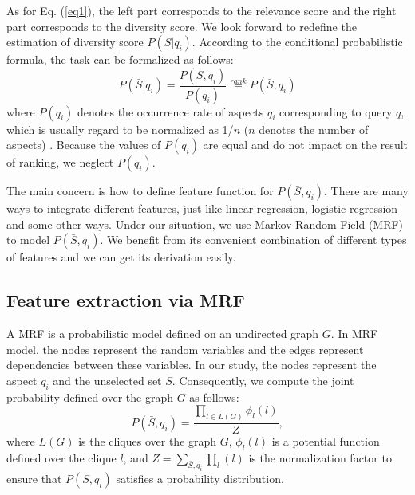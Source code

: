 \documentclass[review]{elsarticle}
\newcommand\revised[1]{{\color{black} #1}}
\begin{document}
\revised{
As for Eq. (\ref{eq1}), the left part corresponds to the relevance score and the right part corresponds to the diversity score. We look forward to redefine the estimation of diversity score $P(\bar{S}|q_i)$. According to the conditional probabilistic formula, the task can be formalized as follows: }
\begin{equation}
	P(\bar{S}|q_i)=\frac{P(\bar{S},q_i)}{P(q_i)}\overset{rank}{=}P(\bar{S},q_i)
	\label{eq3}
\end{equation}
where $P(q_i)$ denotes the occurrence rate of aspects $q_i$ corresponding to query $q$, which is usually regard to be normalized as 1/$n$  ($n$ denotes the number of aspects) \cite{santos2010exploiting}. Because the values of $P(q_i)$ are equal and do not impact on the result of ranking, we neglect $P(q_i)$.

The main concern is how to define feature function for $P(\bar{S}, q_i)$. There are many ways to integrate different features, just like linear regression, logistic regression and some other ways. Under our situation, we use Markov Random Field (MRF) to model $P(\bar{S}, q_i)$. We benefit from its convenient combination of different types of features and we can get its derivation easily.

\subsection{Feature extraction via MRF}
A MRF is a probabilistic model defined on an undirected graph $G$. In MRF model, the nodes represent the random variables and the edges represent dependencies between these variables. In our study, the nodes represent the aspect $q_i$ and the unselected set $\bar{S}$. Consequently, we compute the joint probability defined over the graph $G$ as follows:
\begin{equation}
	P(\bar{S},q_i)=\frac{\prod_{l\in L(G)}\phi_l(l)}{Z},
	\label{eq4}
\end{equation}
where $L(G)$ is the cliques over the graph $G$, $\phi_l(l)$ is a potential function defined over the clique $l$, and $Z=\sum_{\bar{S}, q_i}\prod_l(l)$ is the normalization factor to ensure that $P(\bar{S}, q_i)$ satisfies a probability distribution.
\end{document}
